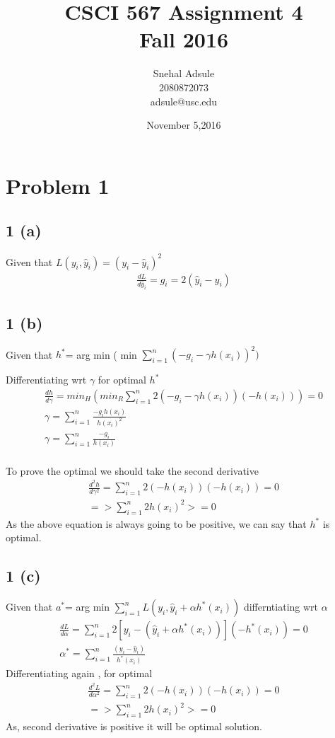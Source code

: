 \documentclass[10pt,letterpaper]{article}
\begin{document}
\title{CSCI 567 Assignment 4 \\Fall 2016}
\date{ November 5,2016}
\author{Snehal Adsule\\2080872073\\adsule@usc.edu}
\maketitle
\section{Problem 1}
\subsection{1 (a) }
Given that $ L(y_i,\hat y_i) = (y_i - \hat y_i)^2$
\begin{align}
	\frac{dL}{d \hat y_i}=g_i= 2( \hat y_i - y_i)
\end{align}

\subsection{1 (b)}
Given that $ h^{*}$= arg min ( min $\sum_{i=1}^n (-g_i -\gamma h(x_i))^2 )$

Differentiating wrt $\gamma$ for optimal $h^*$
\begin{align*}
\frac{dh}{d\gamma}= min_{H}( min_{R} \sum_{i=1}^{n} 2(- g_i - \gamma h(x_i) )(- h(x_i) ) )=0\\
	\gamma =  \sum_{i=1}^{n} \frac{ -g_i h(x_i) }{ h(x_i)^2}\\
	\gamma =  \sum_{i=1}^{n} \frac{ -g_i  }{ h(x_i)}\\
\end{align*}

To prove the optimal we should take the second derivative
\begin{align*}
\frac{d^2h}{d\gamma^2}= \sum_{i=1}^{n} 2(- h(x_i) )(- h(x_i) ) =0\\
=>  \sum_{i=1}^{n} 2 h(x_i)^2 >=0
\end{align*}
As the above equation is always going to be positive, we can say that $h^*$ is optimal.

\subsection{1 (c)}
Given that $ a^{*}$= arg min  $\sum_{i=1}^n L(y_i, \hat y_i + \alpha h^*(x_i))$
differntiating wrt $\alpha$
\begin{align*}
	\frac{dL}{d\alpha}=\sum_{i=1}^{n} 2 [y_i -(\hat y_i + \alpha h^*(x_i))](-h^* (x_i))=0\\
	\alpha^*=\sum_{i=1}^{n}  \frac{(y_i- \hat y_i)}{h^*(x_i)}
\end{align*}
Differentiating again , for optimal
\begin{align*}
\frac{d^2L}{d\alpha^2}= \sum_{i=1}^{n} 2(- h(x_i) )(- h(x_i) ) =0\\
=>  \sum_{i=1}^{n} 2 h(x_i)^2 >= 0
\end{align*}
 As, second derivative is positive it will be optimal solution.
\end{document}
